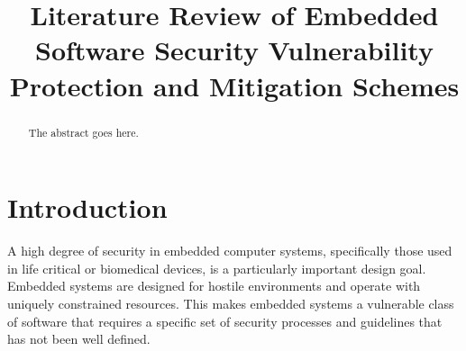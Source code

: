 \documentclass[draftcls,onecolumn,conference,12pt]{IEEEtran}
\begin{document}
%
\title{Literature Review of Embedded Software Security Vulnerability Protection and Mitigation Schemes}

\author{
}

\maketitle


\begin{abstract}
The abstract goes here.
\end{abstract}

\section{Introduction} 

A high degree of security in embedded computer systems, specifically those used in life critical or biomedical devices, is a particularly important design goal.  Embedded systems are designed for hostile environments and operate with uniquely constrained resources. This makes embedded systems a vulnerable class of software that requires a specific set of security processes and guidelines that has not been well defined.   
\end{document}
